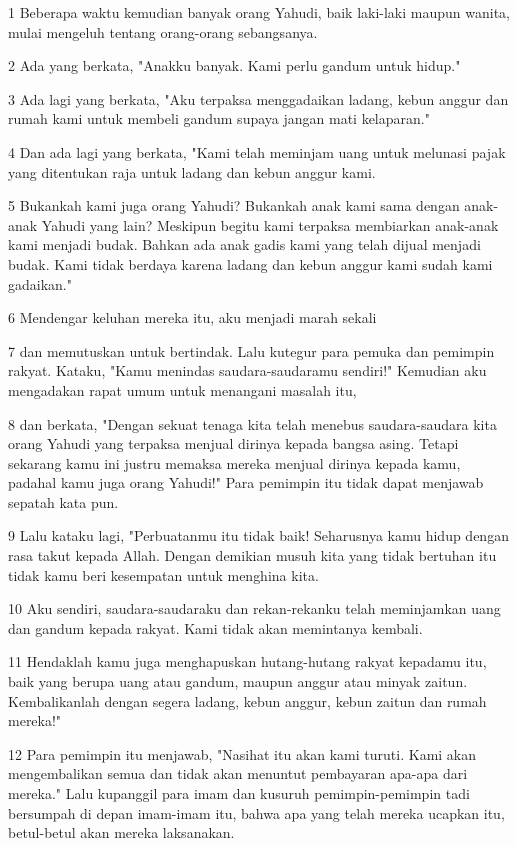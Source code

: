 \par 1 Beberapa waktu kemudian banyak orang Yahudi, baik laki-laki maupun wanita, mulai mengeluh tentang orang-orang sebangsanya.
\par 2 Ada yang berkata, "Anakku banyak. Kami perlu gandum untuk hidup."
\par 3 Ada lagi yang berkata, "Aku terpaksa menggadaikan ladang, kebun anggur dan rumah kami untuk membeli gandum supaya jangan mati kelaparan."
\par 4 Dan ada lagi yang berkata, "Kami telah meminjam uang untuk melunasi pajak yang ditentukan raja untuk ladang dan kebun anggur kami.
\par 5 Bukankah kami juga orang Yahudi? Bukankah anak kami sama dengan anak-anak Yahudi yang lain? Meskipun begitu kami terpaksa membiarkan anak-anak kami menjadi budak. Bahkan ada anak gadis kami yang telah dijual menjadi budak. Kami tidak berdaya karena ladang dan kebun anggur kami sudah kami gadaikan."
\par 6 Mendengar keluhan mereka itu, aku menjadi marah sekali
\par 7 dan memutuskan untuk bertindak. Lalu kutegur para pemuka dan pemimpin rakyat. Kataku, "Kamu menindas saudara-saudaramu sendiri!" Kemudian aku mengadakan rapat umum untuk menangani masalah itu,
\par 8 dan berkata, "Dengan sekuat tenaga kita telah menebus saudara-saudara kita orang Yahudi yang terpaksa menjual dirinya kepada bangsa asing. Tetapi sekarang kamu ini justru memaksa mereka menjual dirinya kepada kamu, padahal kamu juga orang Yahudi!" Para pemimpin itu tidak dapat menjawab sepatah kata pun.
\par 9 Lalu kataku lagi, "Perbuatanmu itu tidak baik! Seharusnya kamu hidup dengan rasa takut kepada Allah. Dengan demikian musuh kita yang tidak bertuhan itu tidak kamu beri kesempatan untuk menghina kita.
\par 10 Aku sendiri, saudara-saudaraku dan rekan-rekanku telah meminjamkan uang dan gandum kepada rakyat. Kami tidak akan memintanya kembali.
\par 11 Hendaklah kamu juga menghapuskan hutang-hutang rakyat kepadamu itu, baik yang berupa uang atau gandum, maupun anggur atau minyak zaitun. Kembalikanlah dengan segera ladang, kebun anggur, kebun zaitun dan rumah mereka!"
\par 12 Para pemimpin itu menjawab, "Nasihat itu akan kami turuti. Kami akan mengembalikan semua dan tidak akan menuntut pembayaran apa-apa dari mereka." Lalu kupanggil para imam dan kusuruh pemimpin-pemimpin tadi bersumpah di depan imam-imam itu, bahwa apa yang telah mereka ucapkan itu, betul-betul akan mereka laksanakan.
